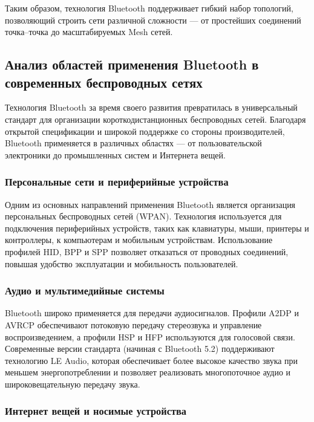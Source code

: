 Таким образом, технология Bluetooth поддерживает гибкий набор топологий, позволяющий строить сети различной сложности --- от простейших соединений точка--точка до масштабируемых Mesh сетей.


\subsection{Анализ областей применения Bluetooth в современных беспроводных сетях}

Технология Bluetooth за время своего развития превратилась в универсальный стандарт для организации короткодистанционных беспроводных сетей. Благодаря открытой спецификации и широкой поддержке со стороны производителей, Bluetooth применяется в различных областях — от пользовательской электроники до промышленных систем и Интернета вещей.

\subsubsection{Персональные сети и периферийные устройства}

Одним из основных направлений применения Bluetooth является организация персональных беспроводных сетей (WPAN). Технология используется для подключения периферийных устройств, таких как клавиатуры, мыши, принтеры и контроллеры, к компьютерам и мобильным устройствам. Использование профилей HID, BPP и SPP позволяет отказаться от проводных соединений, повышая удобство эксплуатации и мобильность пользователей.

\subsubsection{Аудио и мультимедийные системы}

Bluetooth широко применяется для передачи аудиосигналов. Профили A2DP и AVRCP обеспечивают потоковую передачу стереозвука и управление воспроизведением, а профили HSP и HFP используются для голосовой связи. Современные версии стандарта (начиная с Bluetooth 5.2) поддерживают технологию LE Audio, которая обеспечивает более высокое качество звука при меньшем энергопотреблении и позволяет реализовать многопоточное аудио и широковещательную передачу звука.

\subsubsection{Интернет вещей и носимые устройства}

